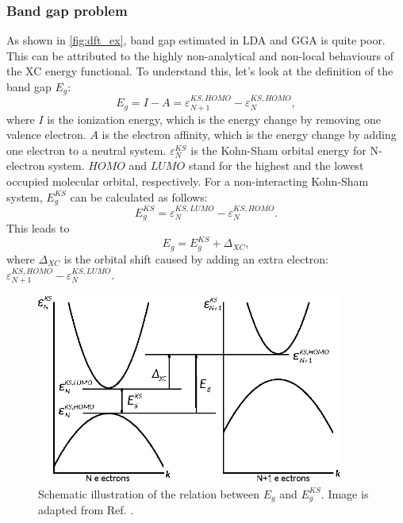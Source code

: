\subsubsection{Band gap problem}
As shown in \autoref{fig:dft_ex}, band gap estimated in LDA and GGA is quite poor. This can be attributed to the highly non-analytical and non-local behaviours of the XC energy functional. To understand this, let's look at the definition of the band gap $E_{g}$:
\begin{equation}
E_{g}=I-A=\varepsilon_{N+1}^{KS,HOMO}-\varepsilon_N^{KS,HOMO},
\end{equation}
where $I$ is the ionization energy, which is the energy change by removing one valence electron. $A$ is the electron affinity, which is the energy change by adding one electron to a neutral system. $\varepsilon_N^{KS}$ is the Kohn-Sham orbital energy for N-electron system. $HOMO$ and $LUMO$ stand for the highest and the lowest occupied molecular orbital, respectively. For a non-interacting Kohn-Sham system, $E_{g}^{KS}$ can be calculated as follows:
\begin{equation}
E_{g}^{KS}=\varepsilon_{N}^{KS,LUMO}-\varepsilon_{N}^{KS,HOMO}.
\end{equation}
This leads to 
\begin{equation}
E_{g}=E_{g}^{KS}+\Delta_{XC},
\end{equation}
where $\Delta_{XC}$ is the orbital shift caused by adding an extra electron: $\varepsilon_{N+1}^{KS,HOMO}-\varepsilon_{N}^{KS,LUMO}$.
\begin{figure}[htbp!] 
\centering  
\includegraphics[width=0.9\textwidth]{Eg.eps}
\caption[Schematic illustration of the relation between $E_g$ and $E^{KS}_g$]{ Schematic illustration of the relation between $E_g$ and $E^{KS}_g$. Image is adapted from Ref. \cite{fiolhais2008primer}.}  
\label{fig:dft_eg}
\end{figure} 

